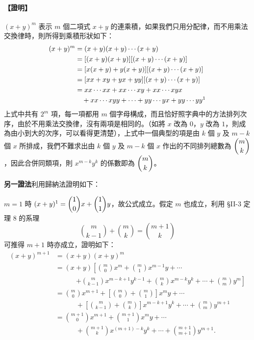 \paragraph{【證明】}
$(x + y)^m$ 表示 $m$ 個二項式 $x + y$ 的連乘積，如果我們只用分配律，而不用乘法交換律時，則所得到乘積形狀如下：
\begin{align*}
(x + y)^m &= (x + y)(x + y)\dotsb(x + y) \\
&= [(x + y)(x + y)][(x + y)\dotsb(x + y)] \\
&= [x(x + y) + y(x + y)][(x + y)\dotsb(x + y)] \\
&= [xx + xy + yx + yy][(x + y)\dotsb(x + y)] \\
&= xx\dotsb xx + xx\dotsb xy + xx\dotsb xyx \\
&\quad + xx\dotsb xyy + \dotsb + yy\dotsb yx + yy\dotsb yy\footnotemark
\end{align*}
\label{note:b5s-ch2-p85-expand}
上式中共有 $2^m$ 項，每一項都用 $m$ 個字母構成，而且恰好照字典中的方法排列次序，由於不用乘法交換律，沒有兩項是相同的。（如將 $x$ 改為 $0$，$y$ 改為 $1$，則成為由小到大的次序，可以看得更清楚），上式中一個典型的項是由 $k$ 個 $y$ 及 $m - k$ 個 $x$ 所排成，我們不難求出由 $k$ 個 $y$ 及 $m - k$ 個 $x$ 作出的不同排列總數為 $\dbinom{m}{k}$，因此合併同類項，則 $x^{m-k} y^k$ 的係數即為 $\dbinom{m}{k}$。

\medskip
\noindent\textbf{另一證法}\quad 利用歸納法證明如下：

$m = 1$ 時 $(x + y)^1 = \dbinom{1}{0} x + \dbinom{1}{1} y$，故公式成立。假定 $m$ 也成立，利用 \S II-3 定理 8 的系理
\[ \binom{m}{k-1} + \binom{m}{k} = \binom{m+1}{k} \]
可推得 $m+1$ 時亦成立，證明如下：
\begin{align*}
(x + y)^{m+1} &= (x + y)(x + y)^m \\
&= (x + y) \left[ \binom{m}{0} x^m + \binom{m}{1} x^{m-1} y + \dotsb \right. \\
&\qquad\quad \left. + \binom{m}{k-1} x^{m-k+1} y^{k-1} + \binom{m}{k} x^{m-k} y^k + \dotsb + \binom{m}{m} y^m \right] \\
&= \binom{m}{0} x^{m+1} + \left[ \binom{m}{0} + \binom{m}{1} \right] x^m y + \dotsb \\
&\qquad\quad + \left[ \binom{m}{k-1} + \binom{m}{k} \right] x^{m-k+1} y^k + \dotsb + \binom{m}{m} y^{m+1} \\
&= \binom{m+1}{0} x^{m+1} + \binom{m+1}{1} x^m y + \dotsb \\
&\qquad\quad + \binom{m+1}{k} x^{(m+1)-k} y^k + \dotsb + \binom{m+1}{m+1} y^{m+1}.
\end{align*}


